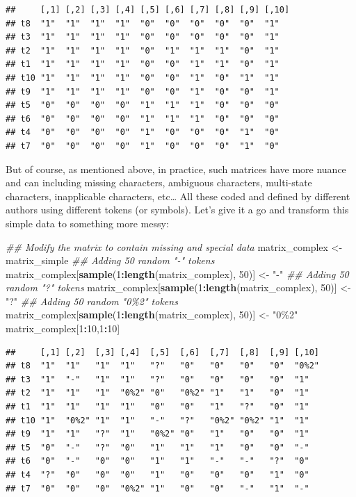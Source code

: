 \documentclass[
]{book}
\newenvironment{Shaded}{\begin{snugshade}}{\end{snugshade}}
\newcommand{\CommentTok}[1]{\textcolor[rgb]{0.56,0.35,0.01}{\textit{#1}}}
\newcommand{\DecValTok}[1]{\textcolor[rgb]{0.00,0.00,0.81}{#1}}
\newcommand{\KeywordTok}[1]{\textcolor[rgb]{0.13,0.29,0.53}{\textbf{#1}}}
\newcommand{\NormalTok}[1]{#1}
\newcommand{\OperatorTok}[1]{\textcolor[rgb]{0.81,0.36,0.00}{\textbf{#1}}}
\newcommand{\StringTok}[1]{\textcolor[rgb]{0.31,0.60,0.02}{#1}}
\begin{document}
\begin{verbatim}
##     [,1] [,2] [,3] [,4] [,5] [,6] [,7] [,8] [,9] [,10]
## t8  "1"  "1"  "1"  "1"  "0"  "0"  "0"  "0"  "0"  "1"  
## t3  "1"  "1"  "1"  "1"  "0"  "0"  "0"  "0"  "0"  "1"  
## t2  "1"  "1"  "1"  "1"  "0"  "1"  "1"  "1"  "0"  "1"  
## t1  "1"  "1"  "1"  "1"  "0"  "0"  "1"  "1"  "0"  "1"  
## t10 "1"  "1"  "1"  "1"  "0"  "0"  "1"  "0"  "1"  "1"  
## t9  "1"  "1"  "1"  "1"  "0"  "0"  "1"  "0"  "0"  "1"  
## t5  "0"  "0"  "0"  "0"  "1"  "1"  "1"  "0"  "0"  "0"  
## t6  "0"  "0"  "0"  "0"  "1"  "1"  "1"  "0"  "0"  "0"  
## t4  "0"  "0"  "0"  "0"  "1"  "0"  "0"  "0"  "1"  "0"  
## t7  "0"  "0"  "0"  "0"  "1"  "0"  "0"  "0"  "1"  "0"
\end{verbatim}

But of course, as mentioned above, in practice, such matrices have more nuance and can including missing characters, ambiguous characters, multi-state characters, inapplicable characters, etc\ldots{}
All these coded and defined by different authors using different tokens (or symbols).
Let's give it a go and transform this simple data to something more messy:

\begin{Shaded}
\begin{Highlighting}[]
\CommentTok{\#\# Modify the matrix to contain missing and special data}
\NormalTok{matrix\_complex \textless{}{-}}\StringTok{ }\NormalTok{matrix\_simple}
\CommentTok{\#\# Adding 50 random "{-}" tokens}
\NormalTok{matrix\_complex[}\KeywordTok{sample}\NormalTok{(}\DecValTok{1}\OperatorTok{:}\KeywordTok{length}\NormalTok{(matrix\_complex), }\DecValTok{50}\NormalTok{)] \textless{}{-}}\StringTok{ "{-}"}
\CommentTok{\#\# Adding 50 random "?" tokens}
\NormalTok{matrix\_complex[}\KeywordTok{sample}\NormalTok{(}\DecValTok{1}\OperatorTok{:}\KeywordTok{length}\NormalTok{(matrix\_complex), }\DecValTok{50}\NormalTok{)] \textless{}{-}}\StringTok{ "?"}
\CommentTok{\#\# Adding 50 random "0\%2" tokens}
\NormalTok{matrix\_complex[}\KeywordTok{sample}\NormalTok{(}\DecValTok{1}\OperatorTok{:}\KeywordTok{length}\NormalTok{(matrix\_complex), }\DecValTok{50}\NormalTok{)] \textless{}{-}}\StringTok{ "0\%2"}
\NormalTok{matrix\_complex[}\DecValTok{1}\OperatorTok{:}\DecValTok{10}\NormalTok{,}\DecValTok{1}\OperatorTok{:}\DecValTok{10}\NormalTok{]}
\end{Highlighting}
\end{Shaded}

\begin{verbatim}
##     [,1] [,2]  [,3] [,4]  [,5]  [,6]  [,7]  [,8]  [,9] [,10]
## t8  "1"  "1"   "1"  "1"   "?"   "0"   "0"   "0"   "0"  "0%2"
## t3  "1"  "-"   "1"  "1"   "?"   "0"   "0"   "0"   "0"  "1"  
## t2  "1"  "1"   "1"  "0%2" "0"   "0%2" "1"   "1"   "0"  "1"  
## t1  "1"  "1"   "1"  "1"   "0"   "0"   "1"   "?"   "0"  "1"  
## t10 "1"  "0%2" "1"  "1"   "-"   "?"   "0%2" "0%2" "1"  "1"  
## t9  "1"  "1"   "?"  "1"   "0%2" "0"   "1"   "0"   "0"  "1"  
## t5  "0"  "-"   "?"  "0"   "1"   "1"   "1"   "0"   "0"  "-"  
## t6  "0"  "-"   "0"  "0"   "1"   "1"   "-"   "-"   "?"  "0"  
## t4  "?"  "0"   "0"  "0"   "1"   "0"   "0"   "0"   "1"  "0"  
## t7  "0"  "0"   "0"  "0%2" "1"   "0"   "0"   "-"   "1"  "-"
\end{verbatim}
\end{document}
